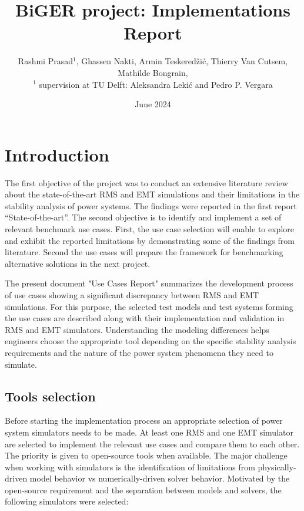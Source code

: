 \documentclass{report}
\title{BiGER project: Implementations Report}
\author{Rashmi Prasad$^1$, Ghassen Nakti, Armin Teskeredžić, Thierry Van Cutsem, Mathilde Bongrain, \\
$^1$ supervision at TU Delft: Aleksandra Lekić and Pedro P. Vergara}
\date{June 2024}
\begin{document}
\maketitle


\section*{Introduction}
The first objective of the project was to conduct an extensive literature review about the state-of-the-art RMS and EMT simulations and their limitations in the stability analysis of power systems. The findings were reported in the first report “State-of-the-art”.
The second objective is to identify and implement a set of relevant benchmark use cases. First, the use case selection will enable to explore and exhibit the reported limitations by demonstrating some of the findings from literature. Second the use cases will prepare the framework for benchmarking alternative solutions in the next project.

The present document "Use Cases Report" summarizes the development process of use cases showing a significant discrepancy between RMS and EMT simulations. For this purpose, the selected test models and test systems forming the use cases are described along with their implementation and validation in RMS and EMT simulators. Understanding the modeling differences helps engineers choose the appropriate tool depending on the specific stability analysis requirements and the nature of the power system phenomena they need to simulate.

\subsection*{Tools selection}
Before starting the implementation process an appropriate selection of power system simulators needs to be made. At least one RMS and one EMT simulator are selected to implement the relevant use cases and compare them to each other. The priority is given to open-source tools when available.
The major challenge when working with simulators is the identification of limitations from physically-driven model behavior vs numerically-driven solver behavior.
Motivated by the open-source requirement and the separation between models and solvers, the following simulators were selected:
\end{document}
